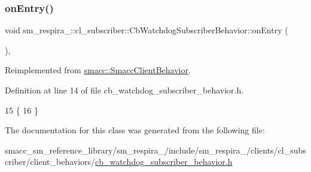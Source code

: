 \subsubsection{\texorpdfstring{on\+Entry()}{onEntry()}}
{\footnotesize\ttfamily void sm\+\_\+respira\+\_\+::cl\+\_\+subscriber\+::\+Cb\+Watchdog\+Subscriber\+Behavior\+::on\+Entry (\begin{DoxyParamCaption}{ }\end{DoxyParamCaption})\hspace{0.3cm}{\ttfamily [inline]}, {\ttfamily [virtual]}}



Reimplemented from \hyperlink{classsmacc_1_1SmaccClientBehavior_a7962382f93987c720ad432fef55b123f}{smacc\+::\+Smacc\+Client\+Behavior}.



Definition at line 14 of file cb\+\_\+watchdog\+\_\+subscriber\+\_\+behavior.\+h.


\begin{DoxyCode}
15     \{
16     \}
\end{DoxyCode}


The documentation for this class was generated from the following file\+:\begin{DoxyCompactItemize}
\item 
smacc\+\_\+sm\+\_\+reference\+\_\+library/sm\+\_\+respira\+\_/include/sm\+\_\+respira\+\_/clients/cl\+\_\+subscriber/client\+\_\+behaviors/\hyperlink{sm__respira__1_2include_2sm__respira__1_2clients_2cl__subscriber_2client__behaviors_2cb__watchdog__subscriber__behavior_8h}{cb\+\_\+watchdog\+\_\+subscriber\+\_\+behavior.\+h}\end{DoxyCompactItemize}
